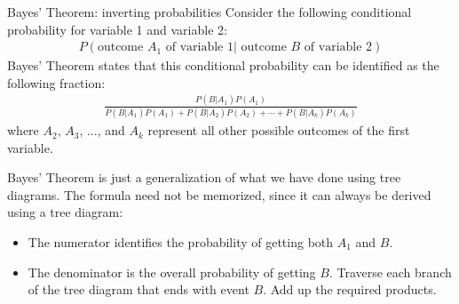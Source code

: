 \D{\newpage}

\begin{onebox}{Bayes' Theorem: inverting probabilities}
Consider the following conditional probability for variable 1 and variable 2:\vspace{-1.5mm}
\begin{align*}
P(\text{outcome $A_1$ of variable 1} | \text{ outcome $B$ of variable 2})
\end{align*}
Bayes' Theorem states that this conditional probability can be identified as the following fraction:\vspace{-1.5mm}
\begin{align*}
\frac{P(B | A_1) P(A_1)}
	{P(B | A_1) P(A_1) + P(B | A_2) P(A_2) + \cdots + P(B | A_k) P(A_k)}
	\label{equationOfBayesTheorem}
\end{align*}
where $A_2$, $A_3$, ..., and $A_k$ represent all other possible outcomes of the first variable.
\end{onebox}

Bayes' Theorem is just a generalization of what we have done using tree diagrams. The formula need not be memorized, since it can always be derived using a tree diagram:
\begin{itemize}
\setlength{\itemsep}{0mm}
\item The numerator identifies the probability of getting both $A_1$ and $B$.
\item The denominator is the overall probability of getting $B$. Traverse each branch of the tree diagram that ends with event $B$. Add up the required products.
\end{itemize}

